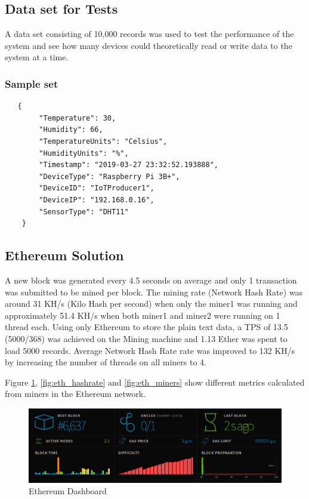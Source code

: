 \documentclass[11pt,openright]{report}
\begin{document}
\subsection{Data set for Tests}
A data set consisting of 10,000 records was used to test the performance of the system and see how many devices could theoretically read or write data to the system at a time.

\subsubsection{Sample set}
\begin{verbatim}
   {
        "Temperature": 30,
        "Humidity": 66,
        "TemperatureUnits": "Celsius",
        "HumidityUnits": "%",
        "Timestamp": "2019-03-27 23:32:52.193888",
        "DeviceType": "Raspberry Pi 3B+",
        "DeviceID": "IoTProducer1",
        "DeviceIP": "192.168.0.16",
        "SensorType": "DHT11"
    }
\end{verbatim}

\subsection{Ethereum Solution}
A new block was generated every 4.5 seconds on average and only 1 transaction was submitted to be mined per block. The mining rate (Network Hash Rate) was around 31 KH/s (Kilo Hash per second) when only the miner1 was running and approximately 51.4 KH/s when both miner1 and miner2 were running on 1 thread each. Using only Ethereum to store the plain text data, a TPS of 13.5 (5000/368) was achieved on the Mining machine and 1.13 Ether was spent to load 5000 records. Average Network Hash Rate rate was improved to 132 KH/s by increasing the number of threads on all miners to 4.

Figure \ref{fig:eth_dashboard}, \ref{fig:eth_hashrate} and \ref{fig:eth_miners} show different metrics calculated from miners in the Ethereum network.

\begin{figure}
    \centering
    \includegraphics[scale=0.8]{results/Dashboard.png}
    \caption{Ethereum Dashboard}
    \label{fig:eth_dashboard}
\end{figure}
\end{document}
